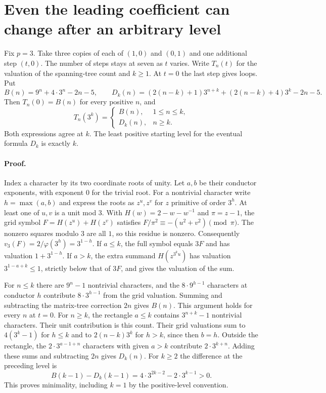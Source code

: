 \section{Even the leading coefficient can change after an arbitrary level}
\label{sec:seven-loop}
Fix $p=3$. Take three copies of each of $(1,0)$ and $(0,1)$ and one
additional step $(t,0)$. The number of steps stays at seven as $t$ varies.
Write $T_n(t)$ for the valuation of the spanning-tree count and
$k\ge1$. At $t=0$ the last step gives loops. Put
\[
 B(n)=9^n+4\cdot3^n-2n-5,\qquad
 D_k(n)=(2(n-k)+1)3^{n+k}+(2(n-k)+4)3^k-2n-5.
\]
Then $T_n(0)=B(n)$ for every positive $n$, and
\[
 T_n(3^k)=
 \begin{cases}
 B(n),&1\le n\le k,\\
 D_k(n),&n\ge k.
 \end{cases}
\]
Both expressions agree at $k$. The least positive starting level for the
eventual formula $D_k$ is exactly $k$.

\paragraph{Proof.}
Index a character by its two coordinate roots of unity. Let $a,b$ be their
conductor exponents, with exponent $0$ for the trivial root. For a
nontrivial character write $h=\max(a,b)$ and express the roots as
$z^u,z^v$ for $z$ primitive of order $3^h$. At least one of $u,v$ is
a unit mod $3$. With $H(w)=2-w-w^{-1}$ and $\pi=z-1$, the grid symbol
$F=H(z^u)+H(z^v)$ satisfies
$F/\pi^2\equiv-(u^2+v^2)\pmod\pi$. The nonzero squares modulo $3$
are all $1$, so this residue is nonzero. Consequently $v_3(F)=
2/\varphi(3^h)=3^{1-h}$.
If $a\le k$, the full symbol equals $3F$ and has valuation
$1+3^{1-h}$. If $a>k$, the extra summand $H(z^{3^k u})$ has valuation
$3^{1-a+k}\le1$, strictly below that of $3F$, and gives the valuation
of the sum.

For $n\le k$ there are $9^n-1$ nontrivial characters, and the
$8\cdot9^{h-1}$ characters at conductor $h$ contribute
$8\cdot3^{h-1}$ from the grid valuation. Summing and subtracting the
matrix-tree correction $2n$ gives $B(n)$. This argument holds for every
$n$ at $t=0$. For $n\ge k$, the rectangle $a\le k$ contains
$3^{n+k}-1$ nontrivial characters. Their unit contribution is this
count. Their grid valuations sum to $4(3^k-1)$ for $h\le k$ and to
$2(n-k)3^k$ for $h>k$, since then $b=h$. Outside the rectangle,
the $2\cdot3^{a-1+n}$ characters with given $a>k$ contribute
$2\cdot3^{k+n}$. Adding these sums and subtracting $2n$ gives
$D_k(n)$. For $k\ge2$ the difference at the preceding level is
\[
 B(k-1)-D_k(k-1)=4\cdot3^{2k-2}-2\cdot3^{k-1}>0.
\]
This proves minimality, including $k=1$ by the positive-level convention.

